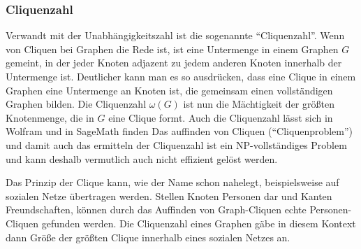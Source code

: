 \documentclass[a4paper,12pt,ngerman,chapterprefix=false,listof=totoc,bibliography=totoc]{scrreprt}
\begin{document}
{\subsubsection*{Cliquenzahl}
{
Verwandt mit der Unabhängigkeitszahl ist die sogenannte "`Cliquenzahl"'. Wenn von Cliquen bei Graphen die Rede ist, ist eine Untermenge in einem Graphen \(G\) gemeint, in der jeder Knoten adjazent zu jedem anderen Knoten innerhalb der Untermenge ist. Deutlicher kann man es so ausdrücken, dass eine Clique in einem Graphen eine Untermenge an Knoten ist, die gemeinsam einen vollständigen Graphen bilden. Die Cliquenzahl \(\omega(G)\) ist nun die Mächtigkeit der größten Knotenmenge, die in \(G\) eine Clique formt. \cite{diestel_graphentheorie_2000} Auch die Cliquenzahl lässt sich in Wolfram und in SageMath finden \cite{wolfram_research_findclique_2015,sagemath_graph_2020} Das auffinden von Cliquen ("`Cliquenproblem"') und damit auch das ermitteln der Cliquenzahl ist ein NP-vollständiges Problem und kann deshalb vermutlich auch nicht effizient gelöst werden.

Das Prinzip der Clique kann, wie der Name schon nahelegt, beispielsweise auf sozialen Netze übertragen werden. Stellen Knoten Personen dar und Kanten Freundschaften, können durch das Auffinden von Graph-Cliquen echte Personen-Cliquen gefunden werden. Die Cliquenzahl eines Graphen gäbe in diesem Kontext dann Größe der größten Clique innerhalb eines sozialen Netzes an.
}
}
\end{document}
